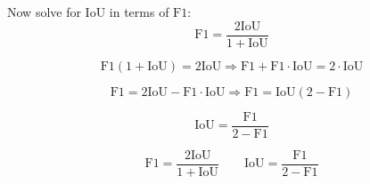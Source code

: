 \noindent
Now solve for \(\text{IoU}\) in terms of \(\text{F1}\):
\[
\text{F1} = \frac{2\text{IoU}}{1 + \text{IoU}}
\]
    
\[
\text{F1}(1 + \text{IoU}) = 2\text{IoU}
\Rightarrow \text{F1} + \text{F1} \cdot \text{IoU} = 2 \cdot \text{IoU}
\]
    
\[
\text{F1} = 2\text{IoU} - \text{F1} \cdot \text{IoU}
\Rightarrow \text{F1} = \text{IoU}(2 - \text{F1})
\]
    
\[
\text{IoU} = \frac{\text{F1}}{2 - \text{F1}}
\]
    
\begin{equation}
    \boxed{
    \text{F1} = \frac{2\text{IoU}}{1 + \text{IoU}} \qquad
    \text{IoU} = \frac{\text{F1}}{2 - \text{F1}}
    }
    \label{eq:conversion}
\end{equation}
\newpage


